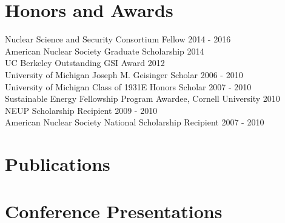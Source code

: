\documentclass[margin,line]{res}
\let\resumesection\section
\begin{document}
\begin{resume}
\section{\sc Honors and Awards} 

Nuclear Science and Security Consortium Fellow \hfill 2014 - 2016 \\
American Nuclear Society Graduate Scholarship \hfill 2014 \\
UC Berkeley Outstanding GSI Award \hfill 2012 \\
University of Michigan Joseph M. Geisinger Scholar \hfill 2006 - 2010 \\
University of Michigan Class of 1931E Honors Scholar \hfill 2007 - 2010 \\
Sustainable Energy Fellowship Program Awardee, Cornell University \hfill 2010 \\
NEUP Scholarship Recipient \hfill 2009 - 2010 \\
American Nuclear Society National Scholarship Recipient \hfill 2007 - 2010 \\

\section{\sc Publications}

\renewcommand{\section}[2]{}
\renewcommand{\section}{\resumesection}

\section{\sc Conference Presentations}

\renewcommand{\section}[2]{}
\renewcommand{\section}{\resumesection}


\end{resume}
\end{document}
